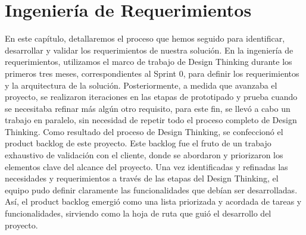 \chapter{Ingeniería de Requerimientos}\label{ch:ingenieriaDeRequerimientos}

En este capítulo, detallaremos el proceso que hemos seguido para identificar, desarrollar y validar los requerimientos de nuestra solución. 
En la ingeniería de requerimientos, utilizamos el marco de trabajo de Design Thinking durante los primeros tres meses, correspondientes al Sprint 0, 
para definir los requerimientos y la arquitectura de la solución.
Posteriormente, a medida que avanzaba el proyecto, se realizaron iteraciones en las etapas de prototipado y prueba cuando se necesitaba refinar más 
algún otro requisito, para este fin, se llevó a cabo un trabajo en paralelo, sin necesidad de repetir todo el proceso completo de Design Thinking.
Como resultado del proceso de Design Thinking, se confeccionó el product backlog de este proyecto. Este backlog fue el fruto de un trabajo exhaustivo 
de validación con el cliente, donde se abordaron y priorizaron los elementos clave del alcance del proyecto. Una vez identificadas y refinadas las necesidades 
y requerimientos a través de las etapas del Design Thinking, el equipo pudo definir claramente las funcionalidades que debían ser desarrolladas. Así, el product 
backlog emergió como una lista priorizada y acordada de tareas y funcionalidades, sirviendo como la hoja de ruta que guió el desarrollo del proyecto.








